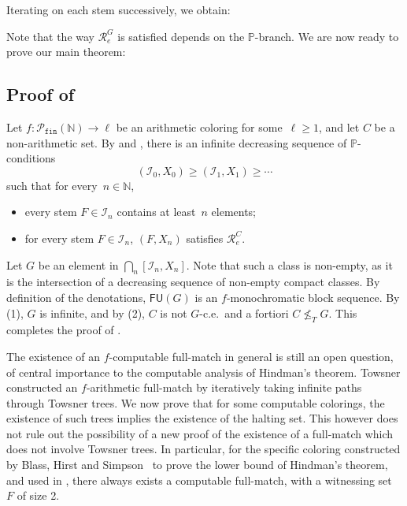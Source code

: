 \documentclass{article}
\def\PP{\mathbb{P}}
\def\I{\mathcal{I}}
\def\Rc{\mathcal{R}}
\newcommand{\NN}[0]{\mathbb{N}}
\newcommand{\Pfin}{\mathcal{P}_{\mathtt{fin}}}
\newcommand{\FU}[0]{\mathsf{FU}} %
\def\h#1{\hat{#1}}
\numberwithin{theorem}{section}
\newtheorem{lemma}[theorem]{Lemma}
\begin{document}
Iterating  on each stem successively, we obtain:


Note that the way $\Rc^G_e$ is satisfied depends on the $\PP$-branch.
We are now ready to prove our main theorem:

\subsection{Proof of }

Let $f : \Pfin(\NN) \to \ell$ be an arithmetic coloring for some~$\ell \geq 1$, and let $C$ be a non-arithmetic set.
By  and , there is an infinite decreasing sequence of $\PP$-conditions
$$
(\I_0, X_0) \geq (\I_1, X_1) \geq \cdots
$$
such that for every~$n \in \NN$,
\begin{itemize}
    \item[(1)] every stem $F \in \I_n$ contains at least~$n$ elements;
    \item[(2)] for every stem $F \in \I_n$, $(F, X_n)$ satisfies $\Rc^C_e$.
\end{itemize}
Let $G$ be an element in $\bigcap_n [\I_n, X_n]$. Note that such a class is non-empty, as it is the intersection of a decreasing sequence of non-empty compact classes. By definition of the denotations, $\FU(G)$ is an $f$-monochromatic block sequence. By (1), $G$ is infinite, and by (2), $C$ is not $G$-c.e.\ and a fortiori $C \not \leq_T G$. This completes the proof of .
\bigskip

The existence of an $f$-computable full-match in general is still an open question, of central importance to the computable analysis of Hindman's theorem. Towsner constructed an $f$-arithmetic full-match by iteratively taking infinite paths through Towsner trees. We now prove that for some computable colorings, the existence of such trees implies the existence of the halting set. This however does not rule out the possibility of a new proof of the existence of a full-match which does not involve Towsner trees. In particular, for the specific coloring constructed by Blass, Hirst and Simpson~\cite{blassLogicalAnalysisTheorems1987} to prove the lower bound of Hindman's theorem, and used in , there always exists a computable full-match, with a witnessing set~$F$ of size 2.
\end{document}
